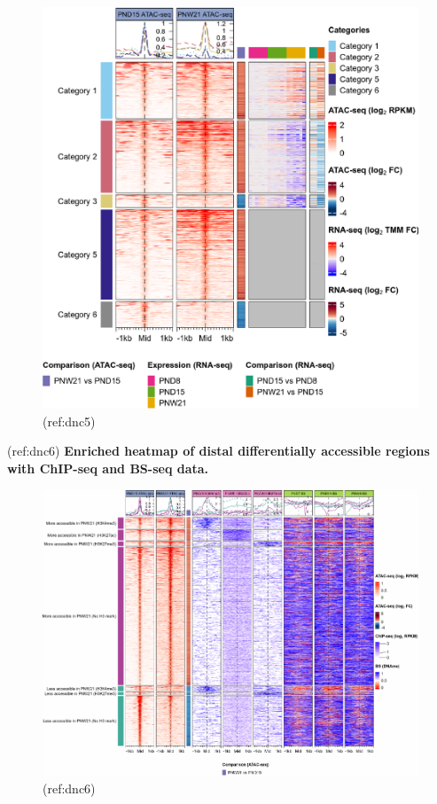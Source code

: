\documentclass[12pt,twoside]{reedthesis}
\begin{document}
\begin{figure}[h]

{\centering \includegraphics{thesis_files/figure-latex/dn5-1} 

}

\caption[Enriched heatmap of proximal DARs]{(ref:dnc5)}\label{fig:dn5}
\end{figure}
(ref:dnc6)
\textbf{Enriched heatmap of distal differentially accessible regions with ChIP-seq and BS-seq data.}
\begin{figure}[h]

{\centering \includegraphics{thesis_files/figure-latex/dn6-1} 

}

\caption[Enriched heatmap of distal DARs with ChIP-seq and BS-seq data]{(ref:dnc6)}\label{fig:dn6}
\end{figure}
\end{document}
